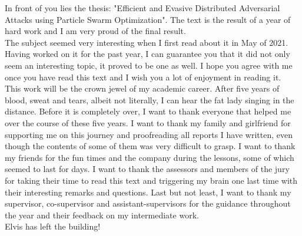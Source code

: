 \begin{preface}
In front of you lies the thesis: "Efficient and Evasive Distributed Adversarial Attacks using Particle Swarm Optimization". The text is the result of a year of hard work and I am very proud of the final result.\\

The subject seemed very interesting when I first read about it in May of 2021. Having worked on it for the past year, I can guarantee you that it did not only seem an interesting topic, it proved to be one as well. I hope you agree with me once you have read this text and I wish you a lot of enjoyment in reading it.\\
 
This work will be the crown jewel of my academic career. After five years of blood, sweat and tears, albeit not literally, I can hear the fat lady singing in the distance. Before it is completely over, I want to thank everyone that helped me over the course of these five years. I want to thank my family and girlfriend for supporting me on this journey and proofreading all reports I have written, even though the contents of some of them was very difficult to grasp. I want to thank my friends for the fun times and the company during the lessons, some of which seemed to last for days. I want to thank the assessors and members of the jury for taking their time to read this text and triggering my brain one last time with their interesting remarks and questions. Last but not least, I want to thank my supervisor, co-supervisor and assistant-supervisors for the guidance throughout the year and their feedback on my intermediate work.\\

Elvis has left the building!\\
\end{preface}